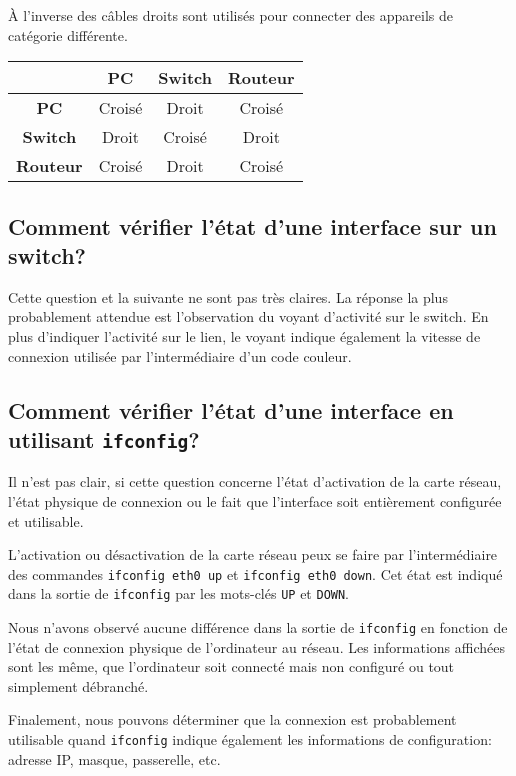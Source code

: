 \documentclass[11pt,a4paper]{article}
\begin{document}
À l'inverse des câbles droits sont utilisés pour connecter des appareils de catégorie différente.

\begin{center}
\begin{tabular}{c|ccc}
	& \textbf{PC} & \textbf{Switch} & \textbf{Routeur} \\
	\hline
	\textbf{PC}      & Croisé & Droit  & Croisé \\
	\textbf{Switch}  & Droit  & Croisé & Droit  \\
	\textbf{Routeur} & Croisé & Droit  & Croisé \\
\end{tabular}
\end{center}

\subsection{Comment vérifier l'état d'une interface sur un switch?}

Cette question et la suivante ne sont pas très claires. La réponse la plus probablement attendue est l'observation du voyant d'activité sur le switch. En plus d'indiquer l'activité sur le lien, le voyant indique également la vitesse de connexion utilisée par l'intermédiaire d'un code couleur.

\subsection{Comment vérifier l'état d'une interface en utilisant \texttt{ifconfig}?}

Il n'est pas clair, si cette question concerne l'état d'activation de la carte réseau, l'état physique de connexion ou le fait que l'interface soit entièrement configurée et utilisable.

L'activation ou désactivation de la carte réseau peux se faire par l'intermédiaire des commandes \texttt{ifconfig eth0 up} et \texttt{ifconfig eth0 down}. Cet état est indiqué dans la sortie de \texttt{ifconfig} par les mots-clés \texttt{UP} et \texttt{DOWN}.

Nous n'avons observé aucune différence dans la sortie de \texttt{ifconfig} en fonction de l'état de connexion physique de l'ordinateur au réseau. Les informations affichées sont les même, que l'ordinateur soit connecté mais non configuré ou tout simplement débranché.

Finalement, nous pouvons déterminer que la connexion est probablement utilisable quand \texttt{ifconfig} indique également les informations de configuration: adresse IP, masque, passerelle, etc.
\end{document}
